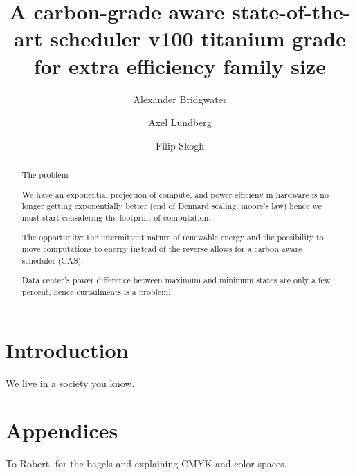 \documentclass[sigplan,screen]{acmart}
\begin{document}
\title{A carbon-grade aware state-of-the-art scheduler v100 titanium grade for extra efficiency family size}

\author{Alexander Bridgwater}

\author{Axel Lundberg}

\author{Filip Skogh}


\begin{abstract}
  The problem

We have an exponential projection of compute, and power efficieny in hardware is no longer getting exponentially better (end of Dennard scaling, moore’s law) hence we must start considering the footprint of computation.

 The opportunity:
the intermittent nature of renewable energy and the possibility to move computations to energy instead of the reverse allows for a carbon aware scheduler (CAS).

Data center’s power difference between maximum and minimum states are only a few percent, hence curtailments is a problem.
\end{abstract}




\maketitle

\section{Introduction}

We live in a society you know.  

\section{Appendices}


\begin{acks}
To Robert, for the bagels and explaining CMYK and color spaces.
\end{acks}




\appendix
\end{document}
